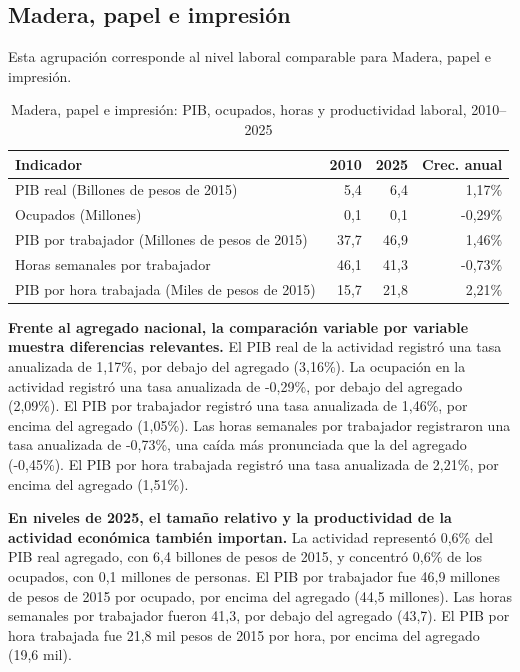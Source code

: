 \subsection{Madera, papel e impresión}

Esta agrupación corresponde al nivel laboral comparable para Madera, papel e impresión.

\begin{table}[H]
\centering
\caption{Madera, papel e impresión: PIB, ocupados, horas y productividad laboral, 2010--2025}
\label{tab:agg25_c03_productividad}
\small
\begin{tabular}{lrrr}
\toprule
Indicador & 2010 & 2025 & Crec. anual \\
\midrule
PIB real  (Billones de pesos de 2015) & 5,4 & 6,4 & 1,17\% \\
Ocupados (Millones) & 0,1 & 0,1 & -0,29\% \\
PIB por trabajador (Millones de pesos de 2015) & 37,7 & 46,9 & 1,46\% \\
Horas semanales por trabajador & 46,1 & 41,3 & -0,73\% \\
PIB por hora trabajada (Miles de pesos de 2015) & 15,7 & 21,8 & 2,21\% \\
\bottomrule
\end{tabular}
\end{table}

\textbf{Frente al agregado nacional, la comparación variable por variable muestra diferencias relevantes.} El PIB real de la actividad registró una tasa anualizada de 1,17\%, por debajo del agregado (3,16\%). La ocupación en la actividad registró una tasa anualizada de -0,29\%, por debajo del agregado (2,09\%). El PIB por trabajador registró una tasa anualizada de 1,46\%, por encima del agregado (1,05\%). Las horas semanales por trabajador registraron una tasa anualizada de -0,73\%, una caída más pronunciada que la del agregado (-0,45\%). El PIB por hora trabajada registró una tasa anualizada de 2,21\%, por encima del agregado (1,51\%).

\textbf{En niveles de 2025, el tamaño relativo y la productividad de la actividad económica también importan.} La actividad representó 0,6\% del PIB real agregado, con 6,4 billones de pesos de 2015, y concentró 0,6\% de los ocupados, con 0,1 millones de personas. El PIB por trabajador fue 46,9 millones de pesos de 2015 por ocupado, por encima del agregado (44,5 millones). Las horas semanales por trabajador fueron 41,3, por debajo del agregado (43,7). El PIB por hora trabajada fue 21,8 mil pesos de 2015 por hora, por encima del agregado (19,6 mil).

